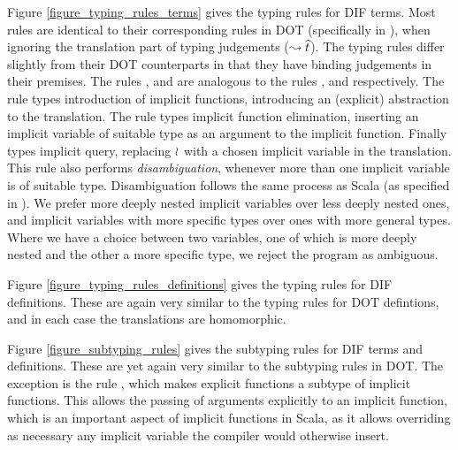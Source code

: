 Figure \ref{figure_typing_rules_terms} gives the typing rules for DIF terms.
Most rules are identical to their corresponding rules in DOT (specifically in
\cite{AGORS16}), when ignoring the translation part of typing judgements
($\leadsto \widehat{t}$). The typing rules differ slightly from their DOT
counterparts in that they have binding judgements in their premises. The rules
,  and  are analogous to the rules
,  and  respectively. The rule
 types introduction of implicit functions, introducing an
(explicit) abstraction to the translation. The rule  types
implicit function elimination, inserting an implicit variable of suitable type
as an argument to the implicit function. Finally  types implicit
query, replacing $\wr$ with a chosen implicit variable in the translation.
This rule also performs \emph{disambiguation}, whenever more than one implicit
variable is of suitable type. Disambiguation follows the same process as Scala
(as specified in \cite{OBLB18}). We prefer more deeply nested implicit
variables over less deeply nested ones, and implicit variables with more
specific types over ones with more general types. Where we have a choice
between two variables, one of which is more deeply nested and the other a more
specific type, we reject the program as ambiguous.

\begin{figure*}[h]
    
    \caption{Typing and translation rules for DIF terms}
    \label{figure_typing_rules_terms}
\end{figure*}

Figure \ref{figure_typing_rules_definitions} gives the typing rules for DIF
definitions. These are again very similar to the typing rules for DOT
defintions, and in each case the translations are homomorphic.

\begin{figure*}[h]
    
    \caption{Typing and translation rules for DIF definitions}
    \label{figure_typing_rules_definitions}
\end{figure*}

Figure \ref{figure_subtyping_rules} gives the subtyping rules for DIF terms and
definitions. These are yet again very similar to the subtyping rules in DOT.
The exception is the rule , which makes explicit functions
a subtype of implicit functions. This allows the passing of arguments
explicitly to an implicit function, which is an important aspect of implicit
functions in Scala, as it allows overriding as necessary any implicit variable
the compiler would otherwise insert.

\begin{figure*}[h]
    
    \caption{Subtyping rules for DIF}
    \label{figure_subtyping_rules}
\end{figure*}
